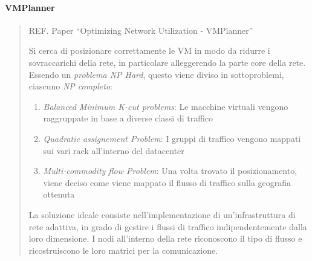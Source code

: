 \documentclass{article}
\providecommand{\tightlist}{%
		  \setlength{\itemsep}{0pt}\setlength{\parskip}{0pt}}
\begin{document}
		\paragraph{VMPlanner}
		\begin{quote}
		REF. Paper ``Optimizing Network Utilization -
		VMPlanner''
		
		Si cerca di posizionare correttamente le VM in modo da
		ridurre i sovraccarichi della rete, in particolare
		alleggerendo la parte core della rete. Essendo un \emph{problema
		NP Hard}, questo viene diviso in sottoproblemi, ciascuno \emph{NP
		completo}:
		
		\begin{enumerate}
		\def\labelenumi{\arabic{enumi}.}
		\tightlist
		\item
		  \textit{Balanced Minimum K-cut problems}: Le macchine virtuali vengono raggruppate in base a diverse classi di traffico
		\item
		  \textit{Quadratic assignement Problem}: I gruppi di traffico vengono mappati sui vari rack all’interno del datacenter
		\item
		  \textit{Multi-commodity flow Problem}: Una volta trovato il posizionamento, viene deciso come viene mappato il flusso di
		  traffico sulla geografia ottenuta
		\end{enumerate}
		
		La soluzione ideale consiste nell'implementazione di
		un'infrastruttura di rete adattiva, in grado di gestire
		i flussi di traffico indipendentemente dalla loro dimensione. I nodi
		all'interno della rete riconoscono il tipo di flusso e
		ricostruiscono le loro matrici per la comunicazione.
		\end{quote}
		
\end{document}
